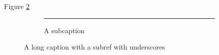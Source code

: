 \documentclass[a4paper,11pt]{report}
\begin{document}
Figure \ref{fig:A_A} %

\begin{figure}[bhpt!]
  \centering
  \begin{subfigure}{0.45\textwidth}
    \rule{3cm}{3cm} %
    \caption{A subcaption}
    \label{fig:A_A_A} %
  \end{subfigure}  
  \caption[A short caption]%
          {A long caption with a subref with underscores }
  \label{fig:A_A} %
\end{figure}
\end{document}
